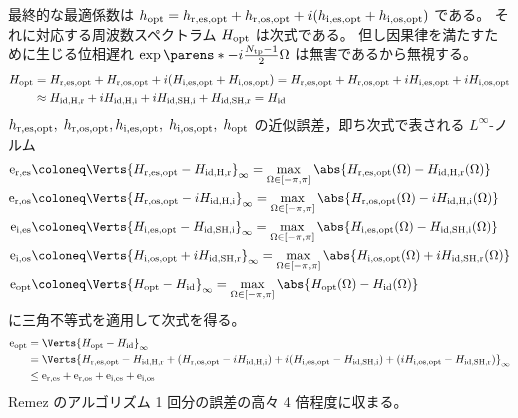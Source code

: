             最終的な最適係数は $h_{\text{opt}} = h_{\text{r,es,opt}} + h_{\text{r,os,opt}} + i(h_{\text{i,es,opt}} + h_{\text{i,os,opt}})$ である。
            それに対応する周波数スペクトラム $H_{\text{opt}}$ は次式である。
            但し因果律を満たすために生じる位相遅れ $\exp\parens*{-i\frac{\Ntp-1}{2}\Omega}$ は無害であるから無視する。
            \begin{align*}
                H_{\text{opt}} &= H_{\text{r,es,opt}} + H_{\text{r,os,opt}} + i(H_{\text{i,es,opt}} + H_{\text{i,os,opt}}) = H_{\text{r,es,opt}} + H_{\text{r,os,opt}} + iH_{\text{i,es,opt}} + iH_{\text{i,os,opt}} \\
                &\approx H_{\text{id,H,r}} + iH_{\text{id,H,i}} + iH_{\text{id,SH,i}} + H_{\text{id,SH,r}} = H_{\text{id}}
            \end{align*}
            $h_{\text{r,es,opt}},\;h_{\text{r,os,opt}},h_{\text{i,es,opt}},\;h_{\text{i,os,opt}},\;h_{\text{opt}}$ の近似誤差，即ち次式で表される $L^\infty$-ノルム
            \begin{align*}
                \erEs &\coloneq \Verts{\HrEsOpt - \HidHr}_\infty = \max_{\Omega\in[-\pi,\pi]}\abs{\HrEsOpt(\Omega) - \HidHr(\Omega)} \\
                \erOs &\coloneq \Verts{\HrOsOpt - i\HidHi}_\infty = \max_{\Omega\in[-\pi,\pi]}\abs{\HrOsOpt(\Omega) - i\HidHi(\Omega)} \\
                \eiEs &\coloneq \Verts{\HiEsOpt - \HidSHi}_\infty = \max_{\Omega\in[-\pi,\pi]}\abs{\HiEsOpt(\Omega) - \HidSHi(\Omega)} \\
                \eiOs &\coloneq \Verts{\HiOsOpt + i\HidSHr}_\infty = \max_{\Omega\in[-\pi,\pi]}\abs{\HiOsOpt(\Omega) + i\HidSHr(\Omega)} \\
                \eOpt &\coloneq \Verts{\Hopt - \Hid}_\infty = \max_{\Omega\in[-\pi,\pi]}\abs{\Hopt(\Omega ) -\Hid(\Omega)}
            \end{align*}
            に三角不等式を適用して次式を得る。
            \begin{align*}
                \eOpt &= \Verts{\Hopt - \Hid}_\infty \\
                &= \Verts{\HrEsOpt - \HidHr + (\HrOsOpt - i\HidHi) + i(\HiEsOpt - \HidSHi) + (i\HiOsOpt - \HidSHr)}_\infty \\
                &\leq \erEs + \erOs + \eiEs + \eiOs
            \end{align*}
            Remez のアルゴリズム 1 回分の誤差の高々 4 倍程度に収まる。
